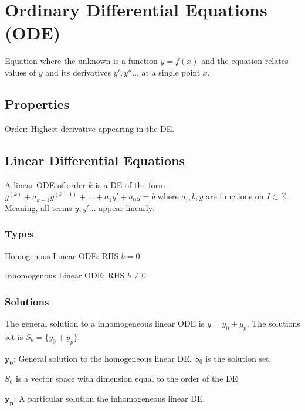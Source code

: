 
\section{Ordinary Differential Equations (ODE)}
Equation where the unknown is a function $y = f(x)$ and the equation relates values of $y$ and its derivatives $y', y'' \dots$ at a single point $x$.

\subsection{Properties}
\begin{compactdesc}
    \item[Order:] Highest derivative appearing in the DE.
\end{compactdesc}

\subsection{Linear Differential Equations}
A linear ODE of order $k$ is a DE of the form $y^{(k)} + a_{k - 1}y^{(k - 1)} + \dots + a_1y' + a_0y = b$ where $a_i, b, y$ are functions on $I \subset \mathbb{K}$. Meaning, all terms $y, y' \dots$ appear linearly.

\subsubsection{Types}
\begin{compactdesc}
    \item[Homogenous Linear ODE:] RHS $b = 0$
    \item[Inhomogenous Linear ODE:] RHS $b \neq 0$
\end{compactdesc}

\subsubsection{Solutions}
The general solution to a inhomogeneous linear ODE is $y = y_0 + y_p$. The solutions set is $S_b = \{y_0 + y_p\}$.
\begin{compactdesc}
    \item[$\mathbf{y_0}$:] General solution to the homogeneous linear DE. $S_0$ is the solution set.
        \begin{compactitem}
            \item $S_0$ is a vector space with dimension equal to the order of the DE
        \end{compactitem}
    \item[$\mathbf{y_p}$:] A particular solution the inhomogeneous linear DE.
\end{compactdesc}

